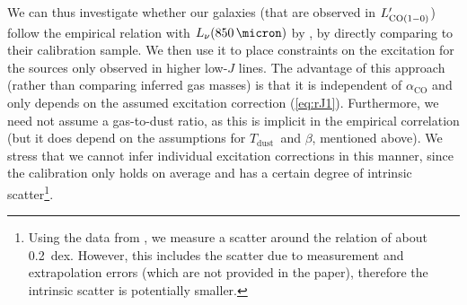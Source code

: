\documentclass[twocolumn]{aastex62}
\newcommand{\aco}{\ensuremath{\alpha_{\mathrm{CO}}}}
\newcommand{\Tdust}{\ensuremath{T_{\mathrm{dust}}}}
\begin{document}
We can thus investigate whether our galaxies (that are observed in
$L'_{\rm CO(1-0)}$) follow the empirical relation with $L_{\nu}(850\,\micron)$
by \cite{Scoville2016}, by directly comparing to their calibration sample.  We
then use it to place constraints on the excitation for the sources only
observed in higher low-$J$ lines.  The advantage of this approach (rather than
comparing inferred gas masses) is that it is independent of $\aco$ and only
depends on the assumed excitation correction (\autoref{eq:rJ1}).  Furthermore,
we need not assume a gas-to-dust ratio, as this is implicit in the empirical
correlation (but it does depend on the assumptions for \Tdust\ and $\beta$,
mentioned above).  We stress that we cannot infer individual excitation
corrections in this manner, since the calibration only holds on average and has
a certain degree of intrinsic scatter\footnote{Using the data from
  \cite{Scoville2016}, we measure a scatter around the relation of about
  0.2~dex.  However, this includes the scatter due to measurement and
  extrapolation errors (which are not provided in the paper), therefore the
  intrinsic scatter is potentially smaller.}.
\end{document}
